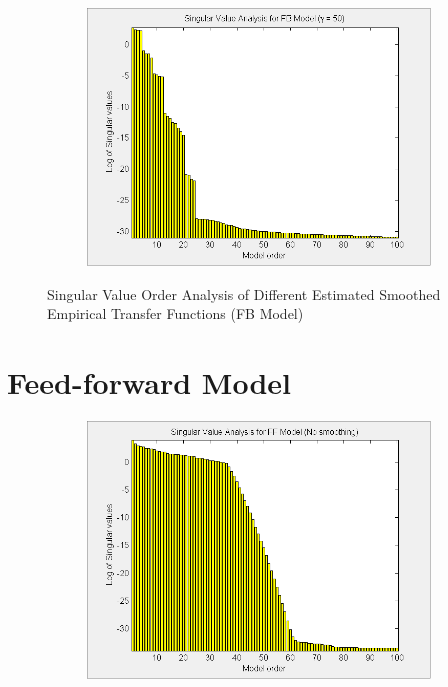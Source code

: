 \begin{landscape}
\begin{figure}[H]
\begin{subfigure}[b]{0.38\textwidth}
\label{pic:}
\end{subfigure}\;\begin{subfigure}[b]{0.38\textwidth}
\includegraphics[width=1.0\textwidth]{pics/SVD_FB_50}

\label{pic:}
\end{subfigure}
\caption{Singular Value Order Analysis of Different Estimated Smoothed Empirical Transfer Functions (FB Model)}
\end{figure}

\section{Feed-forward Model}

\begin{figure}[H]
\centering
\begin{subfigure}[b]{0.38\textwidth}
\includegraphics[width=1.0\textwidth]{pics/SVD_FF_inf}


\end{subfigure}
\end{figure}
\end{landscape}
